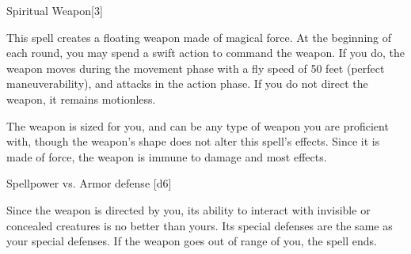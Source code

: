 \begin{spellsection}{Spiritual Weapon}[3]
    \begin{spellheader}
    \end{spellheader}
    \begin{spellcontent}
        \begin{spelltargetinginfo}
        \end{spelltargetinginfo}
        \begin{spelleffects}
            \spelleffect This spell creates a floating weapon made of magical force. At the beginning of each round, you may spend a swift action to command the weapon. If you do, the weapon moves during the movement phase with a fly speed of 50 feet (perfect maneuverability), and attacks in the action phase. If you do not direct the weapon, it remains motionless.

            The weapon is sized for you, and can be any type of weapon you are proficient with, though the weapon's shape does not alter this spell's effects. Since it is made of force, the weapon is immune to damage and most effects.
            \spelldur \durshort \dismissable
        \end{spelleffects}
    \end{spellcontent}
    \begin{spellsubcontent}
        \begin{spelltargetinginfo}
        \end{spelltargetinginfo}
        \begin{spelleffects}
            \begin{spellattack}{Spellpower vs. Armor defense}
                \spellsuccess {}[d6]
            \end{spellattack}
        \end{spelleffects}
    \end{spellsubcontent}
    \begin{spellfooter}
        \spellnotes Since the weapon is directed by you, its ability to interact with invisible or concealed creatures is no better than yours. Its special defenses are the same as your special defenses. If the weapon goes out of range of you, the spell ends.
        \miscastexplode
    \end{spellfooter}
\end{spellsection}

